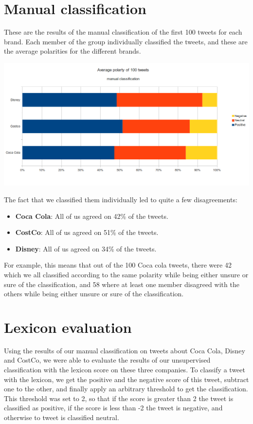 \documentclass[a4paper,12pt]{report}
\begin{document}
\section{Manual classification}

These are the results of the manual classification of the first 100 tweets for each brand. Each member of the group individually classified the tweets, and these are the average polarities for the different brands.

\centerline{\includegraphics[scale=0.6]{../img/man1.png}}

The fact that we classified them individually led to quite a few disagreements:

\begin{itemize}
        \item \textbf{Coca Cola}: All of us agreed on 42\% of the tweets.
        \item \textbf{CostCo}: All of us agreed on 51\% of the tweets.
        \item \textbf{Disney}: All of us agreed on 34\% of the tweets.
\end{itemize}

For example, this means that out of the 100 Coca cola tweets, there were 42 which we all classified according to the same polarity while being either unsure or sure of the classification, and 58 where at least one member disagreed with the others while being either unsure or sure of the classification.

\section{Lexicon evaluation}

Using the results of our manual classification on tweets about Coca Cola, Disney and CostCo, we were able to evaluate the results of our unsupervised classification with the lexicon score on these three companies.
To classify a tweet with the lexicon, we get the positive and the negative score of this tweet, subtract one to the other, and finally apply an arbitrary threshold to get the classification.
This threshold was set to 2, so that if the score is greater than 2 the tweet is classified as positive, if the score is less than -2 the tweet is negative, and otherwise to tweet is classified neutral.
\end{document}
